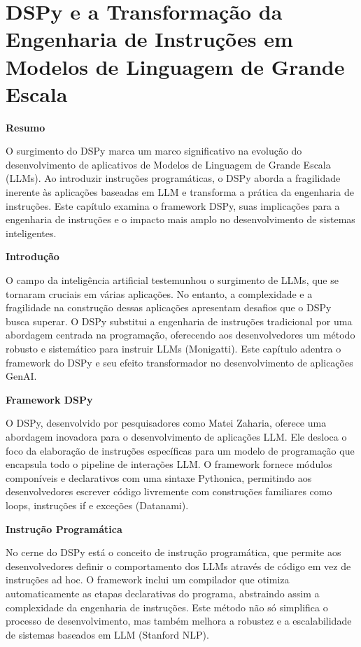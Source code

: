 \documentclass[tcc,capa]{texufpel}
\begin{document}
\section{DSPy e a Transformação da Engenharia de Instruções em Modelos de Linguagem de Grande Escala}
\textbf{Resumo}

O surgimento do DSPy marca um marco significativo na evolução do desenvolvimento de aplicativos de Modelos de Linguagem de Grande Escala (LLMs). Ao introduzir instruções programáticas, o DSPy aborda a fragilidade inerente às aplicações baseadas em LLM e transforma a prática da engenharia de instruções. Este capítulo examina o framework DSPy, suas implicações para a engenharia de instruções e o impacto mais amplo no desenvolvimento de sistemas inteligentes.

\textbf{Introdução}

O campo da inteligência artificial testemunhou o surgimento de LLMs, que se tornaram cruciais em várias aplicações. No entanto, a complexidade e a fragilidade na construção dessas aplicações apresentam desafios que o DSPy busca superar. O DSPy substitui a engenharia de instruções tradicional por uma abordagem centrada na programação, oferecendo aos desenvolvedores um método robusto e sistemático para instruir LLMs (Monigatti). Este capítulo adentra o framework do DSPy e seu efeito transformador no desenvolvimento de aplicações GenAI.

\textbf{Framework DSPy}

O DSPy, desenvolvido por pesquisadores como Matei Zaharia, oferece uma abordagem inovadora para o desenvolvimento de aplicações LLM. Ele desloca o foco da elaboração de instruções específicas para um modelo de programação que encapsula todo o pipeline de interações LLM. O framework fornece módulos componíveis e declarativos com uma sintaxe Pythonica, permitindo aos desenvolvedores escrever código livremente com construções familiares como loops, instruções if e exceções (Datanami).

\textbf{Instrução Programática}

No cerne do DSPy está o conceito de instrução programática, que permite aos desenvolvedores definir o comportamento dos LLMs através de código em vez de instruções ad hoc. O framework inclui um compilador que otimiza automaticamente as etapas declarativas do programa, abstraindo assim a complexidade da engenharia de instruções. Este método não só simplifica o processo de desenvolvimento, mas também melhora a robustez e a escalabilidade de sistemas baseados em LLM (Stanford NLP).
\end{document}
